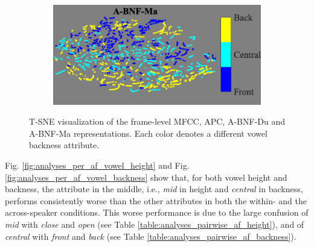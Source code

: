 \documentclass[transmag]{IEEEtran}
\begin{document}
\begin{figure}[!t]
\begin{subfigure}{0.495\linewidth}
    \end{subfigure}    \begin{subfigure}{0.495\linewidth}
	   \centering
	   \includegraphics[width=1\linewidth]{tsne_af_backness_bnf_aidatatang_apc_input_disc_bar_adjust_journal.png}
    \end{subfigure}
    \caption{T-SNE visualization of the frame-level  MFCC, APC, A-BNF-Du and A-BNF-Ma representations. Each color denotes a different vowel backness attribute.}
        \label{fig:analysis_tsne_vowel_backness}

\end{figure}
Fig. \ref{fig:analyses_per_af_vowel_height} and Fig. \ref{fig:analyses_per_af_vowel_backness} show that, for both vowel height and backness, the attribute in the middle, i.e., \textit{mid} in height and \textit{central} in backness, performs consistently worse than the other attributes in both the within- and the across-speaker conditions. This worse performance is due to the  large confusion of \textit{mid} with \textit{close} and \textit{open} (see Table \ref{table:analyses_pairwise_af_height}), and of \textit{central} with \textit{front} and \textit{back} (see Table \ref{table:analyses_pairwise_af_backness}).
\end{document}
